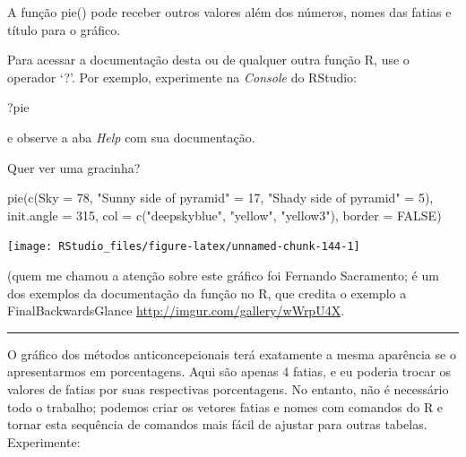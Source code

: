 \documentclass[
]{article}
\newenvironment{Shaded}{\begin{snugshade}}{\end{snugshade}}
\newcommand{\AttributeTok}[1]{\textcolor[rgb]{0.77,0.63,0.00}{#1}}
\newcommand{\ConstantTok}[1]{\textcolor[rgb]{0.00,0.00,0.00}{#1}}
\newcommand{\DecValTok}[1]{\textcolor[rgb]{0.00,0.00,0.81}{#1}}
\newcommand{\FunctionTok}[1]{\textcolor[rgb]{0.00,0.00,0.00}{#1}}
\newcommand{\NormalTok}[1]{#1}
\newcommand{\OtherTok}[1]{\textcolor[rgb]{0.56,0.35,0.01}{#1}}
\newcommand{\StringTok}[1]{\textcolor[rgb]{0.31,0.60,0.02}{#1}}
\begin{document}
A função pie() pode receber outros valores além dos números, nomes das
fatias e título para o gráfico.

Para acessar a documentação desta ou de qualquer outra função R, use o
operador `?'. Por exemplo, experimente na \emph{Console} do RStudio:

\begin{Shaded}
\begin{Highlighting}[]
\NormalTok{?pie}
\end{Highlighting}
\end{Shaded}

e observe a aba \emph{Help} com sua documentação.

Quer ver uma gracinha?

\begin{Shaded}
\begin{Highlighting}[]
\FunctionTok{pie}\NormalTok{(}\FunctionTok{c}\NormalTok{(}\AttributeTok{Sky =} \DecValTok{78}\NormalTok{, }
      \StringTok{"Sunny side of pyramid"} \OtherTok{=} \DecValTok{17}\NormalTok{, }
      \StringTok{"Shady side of pyramid"} \OtherTok{=} \DecValTok{5}\NormalTok{), }
    \AttributeTok{init.angle =} \DecValTok{315}\NormalTok{, }
    \AttributeTok{col =} \FunctionTok{c}\NormalTok{(}\StringTok{"deepskyblue"}\NormalTok{, }\StringTok{"yellow"}\NormalTok{, }\StringTok{"yellow3"}\NormalTok{), }
    \AttributeTok{border =} \ConstantTok{FALSE}\NormalTok{)}
\end{Highlighting}
\end{Shaded}

\begin{center}\texttt{[image: RStudio\_files/figure-latex/unnamed-chunk-144-1]} \end{center}

(quem me chamou a atenção sobre este gráfico foi Fernando Sacramento; é
um dos exemplos da documentação da função no R, que credita o exemplo a
FinalBackwardsGlance \url{http://imgur.com/gallery/wWrpU4X}.

\begin{center}\rule{0.5\linewidth}{0.5pt}\end{center}

O gráfico dos métodos anticoncepcionais terá exatamente a mesma
aparência se o apresentarmos em porcentagens. Aqui são apenas 4 fatias,
e eu poderia trocar os valores de fatias por suas respectivas
porcentagens. No entanto, não é necessário todo o trabalho; podemos
criar os vetores fatias e nomes com comandos do R e tornar esta
sequência de comandos mais fácil de ajustar para outras tabelas.
Experimente:
\end{document}
